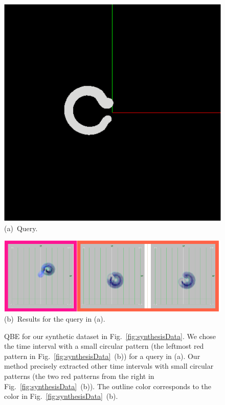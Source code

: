 \begin{figure}[tb]
    \centering
    \begin{minipage}{0.24\linewidth}
        \centering
        \includegraphics[width=.99\linewidth]{figures/QBE.png}
        \footnotesize{\sf (a)~Query.}
    \end{minipage}
    \begin{minipage}{0.75\linewidth}
        \centering
        \includegraphics[width=.99\linewidth]{figures/QBEdemodataResults_revised.png}
        \footnotesize{\sf(b)~Results for the query in (a).}
    \end{minipage}
    \caption{QBE for our synthetic dataset in Fig.~\ref{fig:synthesisData}. 
        We chose the time interval with a small circular pattern (the leftmost red pattern in Fig.~\ref{fig:synthesisData}~(b)) for a query in (a). 
        Our method precisely extracted other time intervals with small circular patterns (the two red patterns from the right in Fig.~\ref{fig:synthesisData}~(b)).
        The outline color corresponds to the color in Fig.~\ref{fig:synthesisData}~(b).}
    \label{fig:QBEDemodata}
\end{figure}
